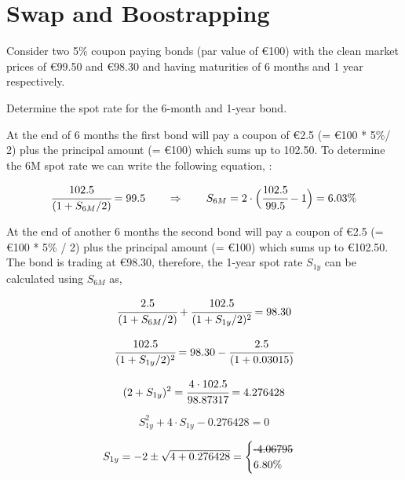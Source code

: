 \chapter{Swap and Boostrapping}\label{introduction-to-python---lesson-7}

\begin{Exercise}[title={(Analytic bootstrapping)}]
Consider two 5\% coupon paying bonds (par value of \euro{100}) with the clean market prices of \euro{99.50} and \euro{98.30} and having maturities of 6 months and 1 year respectively.

Determine the spot rate for the 6-month and 1-year bond.  
\end{Exercise}

\begin{Answer}
At the end of 6 months the first bond will pay a coupon of \euro{2.5} (= \euro{100} * 5\%/ 2) plus the principal amount (= €100) which sums up to 102.50. To
determine the 6M spot rate we can write the following equation, :

\[ \cfrac{102.5}{(1 + S_{6M}/2)} = 99.5\qquad\Rightarrow\qquad S_{6M} = 2 \cdot \Big( \cfrac{102.5}{99.5} - 1 \Big) =  6.03 \%\]

At the end of another 6 months the second bond will pay a coupon of €2.5
(= €100 * 5\% / 2) plus the principal amount (= €100) which sums up to
€102.50. The bond is trading at €98.30, therefore, the 1-year spot rate
\(S_{1y}\) can be calculated using \(S_{6M}\) as,

\[ \cfrac{2.5}{(1+S_{6M}/2)} + \cfrac{102.5}{(1 + S_{1y}/2)^{2}} = 98.30 \]

\[ \cfrac{102.5}{(1 + S_{1y}/2)^{2}} = 98.30 - \cfrac{2.5}{(1+0.03015)} \]

\[ (2 + S_{1y})^{2} = \cfrac{4\cdot102.5}{98.87317} = 4.276428 \]

\[ S_{1y}^{2} + 4\cdot S_{1y} - 0.276428 = 0 \]

\[ S_{1y} = -2 \pm \sqrt{4 + 0.276428} =\begin{cases}\text{\sout{-4.06795}} \\ 6.80\%\end{cases} \]

\end{Answer}

